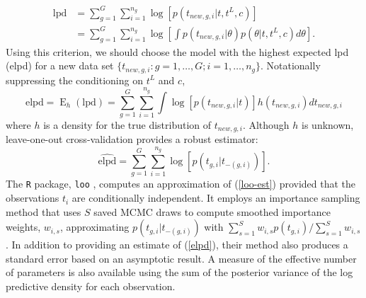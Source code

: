 \documentclass[11pt]{article}
\newcommand{\op}{\operatorname}
\begin{document}
\begin{align*}
\mbox{lpd} &= \sum_{g=1}^G \sum_{i=1}^{n_g} \log[p(t_{new,g,i}|t, t^L, c)] \\
&= \sum_{g=1}^G \sum_{i=1}^{n_g} \log \left[ \int p(t_{new,g, i}|\theta) p(\theta|t,t^L,c) d\theta \right].
\end{align*}
\noindent Using this criterion, we should choose the model with the highest expected lpd (elpd) for a new data set $\{t_{new,g,i}:g=1,\ldots,G; i=1,\ldots,n_g\}$. Notationally suppressing the conditioning on $t^L$ and $c$,
\begin{equation}
\mbox{elpd} = \op{E}_h (\mbox{lpd}) = \sum_{g=1}^G \sum_{i=1}^{n_g} \int \log [p(t_{new, g, i}|t)] h(t_{new,g,i}) d t_{new,g,i}
\label{elpd}
\end{equation}
where $h$ is a density for the true distribution of $t_{new,g,i}$. Although $h$ is unknown, leave-one-out cross-validation provides a robust estimator:
\begin{equation}
\widehat{\text{elpd}} = \sum_{g=1}^G \sum_{i=1}^{n_g} \log [p(t_{g,i}|t_{-(g,i)})].
\label{loo-est}
\end{equation}
The \texttt{R} package, \texttt{loo} \citep{loo}, computes an approximation of (\ref{loo-est}) provided that the observations $t_i$ are conditionally independent. It employs an importance sampling method that uses $S$ saved MCMC draws to compute smoothed importance weights, $w_{i,s}$, approximating $p(t_{g,i}|t_{-(g,i)})$ with $\sum_{s=1}^S w_{i,s} p(t_{g,i})/\sum_{s=1}^S w_{i,s}$. In addition to providing an estimate of (\ref{elpd}), their method also produces a standard error based on an asymptotic result.  A measure of the effective number of parameters is also available using the sum of the posterior variance of the log predictive density for each observation.
\end{document}
